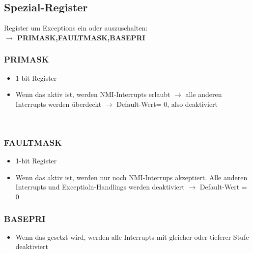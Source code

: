 \subsection{Spezial-Register}     
Register um Exceptions ein oder auszuschalten:\\
\textbf{$\rightarrow$ PRIMASK,FAULTMASK,BASEPRI}

\begin{minipage}{9cm}
    \subsubsection{PRIMASK}
    \begin{itemize}
        \item 1-bit Register
        \item Wenn das aktiv ist, werden NMI-Interrupts erlaubt
        \subitem $\rightarrow$ alle anderen Interrupts werden überdeckt
        \subitem $\rightarrow$ Default-Wert= 0, also deaktiviert
    \end{itemize}
 \end{minipage}
 \begin{minipage}{0.5cm}
 	\-\
 \end{minipage}  
 \begin{minipage}{9cm}
 	\subsubsection{FAULTMASK}
    \begin{itemize}
        \item 1-bit Register
        \item Wenn das aktiv ist, werden nur noch NMI-Interrups akzeptiert.\newline
        Alle anderen Interrupts und Exceptioln-Handlings werden deaktiviert
        \subitem $\rightarrow$ Default-Wert = 0
    \end{itemize}
 \end{minipage}

\subsubsection{BASEPRI}
\begin{itemize}
    \item Wenn das gesetzt wird, werden alle Interrupts mit gleicher oder tieferer Stufe deaktiviert
\end{itemize}


